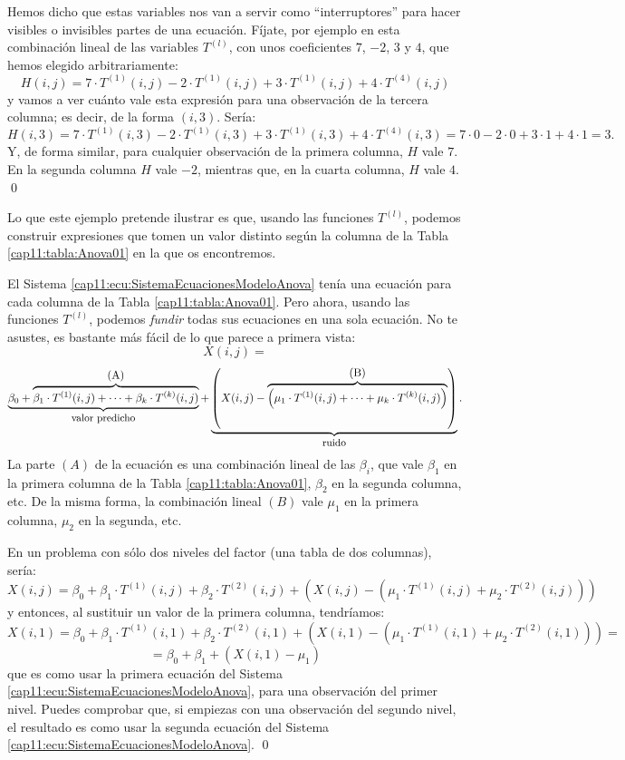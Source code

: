 \begin{ejemplo}
Hemos dicho que estas variables nos van a servir como ``interruptores'' para hacer visibles o invisibles partes de una ecuación. Fíjate, por ejemplo en esta combinación lineal de las variables $T^{(l)}$, con unos coeficientes $7$, $-2$, $3$ y $4$, que hemos elegido arbitrariamente:
\[H(i,j) = 7\cdot T^{(1)}(i,j)-2\cdot T^{(1)}(i,j)+3\cdot T^{(1)}(i,j)+4\cdot T^{(4)}(i,j)\]
y vamos a ver cuánto vale esta expresión para una observación de la tercera columna; es decir, de la forma $(i,3)$. Sería:
\[H(i,3) =
7\cdot T^{(1)}(i,3)-2\cdot T^{(1)}(i,3)+3\cdot T^{(1)}(i,3)+4\cdot T^{(4)}(i,3)=
7\cdot 0-2\cdot 0+3\cdot 1+4\cdot 1 = 3.
\]
Y, de forma similar, para cualquier observación de la primera columna, $H$ vale $7$. En la segunda columna $H$ vale $-2$, mientras que, en la cuarta columna, $H$ vale $4$.
\qed
\end{ejemplo}
Lo que este ejemplo pretende ilustrar es que, usando las funciones $T^{(l)}$, podemos construir expresiones que tomen un valor distinto según la columna de la Tabla \ref{cap11:tabla:Anova01} en la que os encontremos.

El Sistema \ref{cap11:ecu:SistemaEcuacionesModeloAnova} tenía una ecuación para cada columna de la Tabla \ref{cap11:tabla:Anova01}. Pero ahora, usando las funciones $T^{(l)}$, podemos {\em fundir} todas sus ecuaciones en una sola ecuación. No te asustes, es bastante más fácil de lo que parece a primera vista:
{\small
\[
X(i,j)=\]
\[
\underbrace{
\beta_0+
\overbrace{
\beta_1\cdot T^{(1)}(i,j)+\cdots+\beta_k\cdot T^{(k)}(i,j)
}^{\mbox{ (A) }}
}_{\mbox{\small valor predicho}}
+
\underbrace{
\left(X(i,j) -
\overbrace{
\left(\mu_1\cdot T^{(1)}(i,j)+\cdots+\mu_k\cdot T^{(k)}(i,j)\right)
}^{\mbox{ (B) }}
\right)
}_{\mbox{\small ruido}}.
\]
}
La parte $(A)$ de la ecuación es una combinación lineal de las $\beta_i$, que vale $\beta_1$ en la primera columna de la Tabla \ref{cap11:tabla:Anova01}, $\beta_2$  en la segunda columna, etc. De la misma forma, la combinación lineal $(B)$ vale $\mu_1$ en la primera columna, $\mu_2$ en la segunda, etc.
\begin{ejemplo}
En un problema con sólo dos niveles del factor (una tabla de dos columnas), sería:
{\small
\[
X(i,j)=
\beta_0+
\beta_1\cdot T^{(1)}(i,j)+\beta_2\cdot T^{(2)}(i,j)
+
\left(X(i,j) -
\left(\mu_1\cdot T^{(1)}(i,j)+\mu_2\cdot T^{(2)}(i,j)\right)
\right)
\]
}
y entonces, al sustituir un valor de la primera columna, tendríamos:
\[
X(i,1)=
\beta_0+
\beta_1\cdot T^{(1)}(i,1)+\beta_2\cdot T^{(2)}(i,1)
+
\left(X(i,1) -
\left(\mu_1\cdot T^{(1)}(i,1)+\mu_2\cdot T^{(2)}(i,1)\right)
\right)=
\]
\[
=\beta_0+\beta_1+\left(X(i,1) -\mu_1\right)
\]
que es como usar    la primera ecuación del Sistema \ref{cap11:ecu:SistemaEcuacionesModeloAnova}, para una observación del primer nivel. Puedes comprobar que, si empiezas con una observación del segundo nivel, el resultado es como usar la segunda ecuación del  Sistema \ref{cap11:ecu:SistemaEcuacionesModeloAnova}.
\qed
\end{ejemplo}

